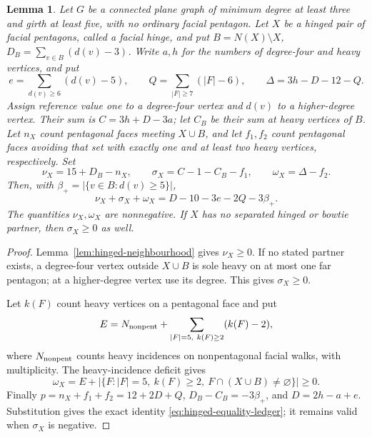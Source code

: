 \documentclass[11pt]{article}
\newtheorem{lemma}[theorem]{Lemma}
\theoremstyle{remark}
\numberwithin{equation}{section}
\numberwithin{table}{section}
\begin{document}
\begin{lemma}\label{lem:hinged-equality-ledger}
Let $G$ be a connected plane graph of minimum degree at least three
and girth at least five, with no ordinary facial pentagon. Let $X$
be a hinged pair of facial pentagons, called a facial hinge, and put
$B=N(X)\setminus X$, $D_B=\sum_{v\in B}(d(v)-3)$. Write $a,h$ for
the numbers of degree-four and heavy vertices, and put
\[
 e=\sum_{d(v)\ge6}(d(v)-5),\qquad
 Q=\sum_{|F|\ge7}(|F|-6),\qquad
 \Delta=3h-D-12-Q.
\]
Assign reference value one to a degree-four vertex and $d(v)$ to
a higher-degree vertex. Their sum is $C=3h+D-3a$; let $C_B$ be
their sum at heavy vertices of $B$. Let $n_X$ count pentagonal faces
meeting $X\cup B$, and let $f_1,f_2$ count pentagonal faces avoiding that set
with exactly one and at least two heavy vertices, respectively. Set
\[
 \nu_X=15+D_B-n_X,\qquad
 \sigma_X=C-1-C_B-f_1,\qquad
 \omega_X=\Delta-f_2.
\]
Then, with $\beta_+=|\{v\in B:d(v)\ge5\}|$,
\begin{equation}\label{eq:hinged-equality-ledger}
 \nu_X+\sigma_X+\omega_X=D-10-3e-2Q-3\beta_+.
\end{equation}
The quantities $\nu_X,\omega_X$ are nonnegative. If $X$ has no
separated hinged or bowtie partner, then $\sigma_X\ge0$ as well.
\end{lemma}
\begin{proof}
Lemma~\ref{lem:hinged-neighbourhood} gives $\nu_X\ge0$. If no
stated partner exists, a degree-four vertex outside $X\cup B$ is
sole heavy on at most one far pentagon; at a higher-degree vertex
use its degree. This gives $\sigma_X\ge0$.

Let $k(F)$ count heavy vertices on a pentagonal face and put
\[
 E=N_{\rm nonpent}+\sum_{|F|=5,\ k(F)\ge2}(k(F)-2),
\]
where $N_{\rm nonpent}$ counts heavy incidences on nonpentagonal
facial walks, with multiplicity. The heavy-incidence deficit gives
\begin{equation}\label{eq:hinged-multiheavy-loss}
 \omega_X=E+
 |\{F:|F|=5,\ k(F)\ge2,\ F\cap(X\cup B)\ne\varnothing\}|\ge0.
\end{equation}
Finally $p=n_X+f_1+f_2=12+2D+Q$,
$D_B-C_B=-3\beta_+$, and $D=2h-a+e$. Substitution gives the exact
identity \eqref{eq:hinged-equality-ledger}; it remains valid when
$\sigma_X$ is negative.
\end{proof}
\end{document}
